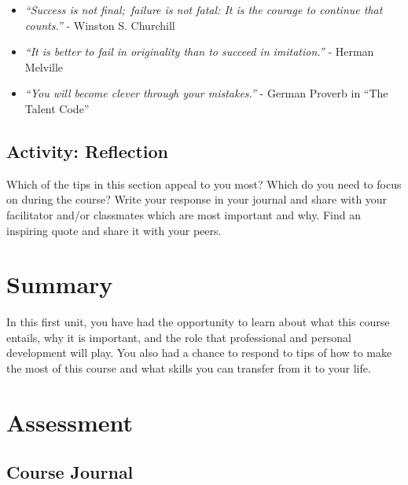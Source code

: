 \documentclass[
]{book}
\begin{document}
\begin{itemize}
\item
  \emph{``Success is not final;~failure is not fatal: It is the courage to continue that counts.''} - Winston S. Churchill
\item
  \emph{``It is better to fail in originality than to succeed in imitation.''} - Herman Melville
\item
  \emph{``You will become clever through your mistakes.''} - German Proverb in ``The Talent Code''
\end{itemize}

\hypertarget{activity-reflection}{%
\subsection*{Activity: Reflection}\label{activity-reflection}}

\begin{reflect}
Which of the tips in this section appeal to you most? Which do you need to focus on during the course? Write your response in your journal and share with your facilitator and/or classmates which are most important and why. Find an inspiring quote and share it with your peers.
\end{reflect}

\hypertarget{summary}{%
\section*{Summary}\label{summary}}

In this first unit, you have had the opportunity to learn about what this course entails, why it is important, and the role that professional and personal development will play. You also had a chance to respond to tips of how to make the most of this course and what skills you can transfer from it to your life.

\hypertarget{assessment-1}{%
\section*{Assessment}\label{assessment-1}}

\hypertarget{course-journal}{%
\subsection*{Course Journal}\label{course-journal}}
\end{document}
